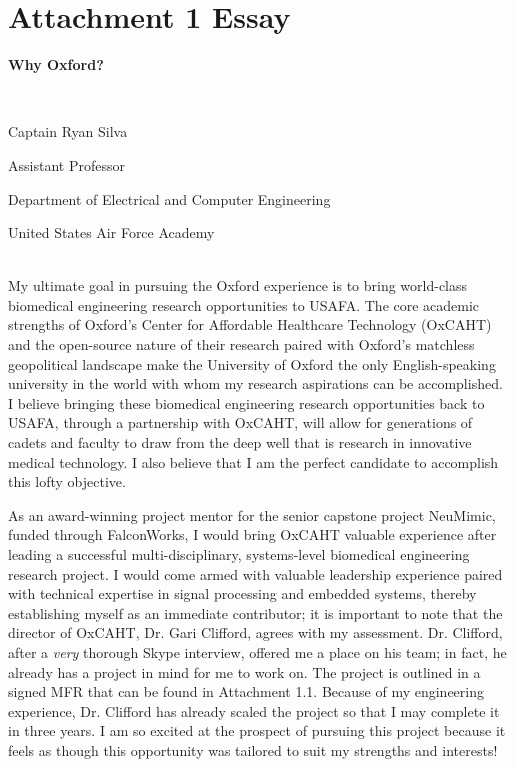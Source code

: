 \documentclass{article}
\begin{document}
\section*{Attachment 1 \newline Essay}
	\centerline{\LARGE{\textbf{Why Oxford?}}} \hspace{0pt} \\
	\centerline{\Large{Captain Ryan Silva}}
	\centerline{\large{Assistant Professor}}
	\centerline{\large{Department of Electrical and Computer Engineering}}
	\centerline{\large{United States Air Force Academy}} \hspace{0pt} \\
\indent My ultimate goal in pursuing the Oxford experience is to bring world-class
biomedical engineering research opportunities to USAFA. The core academic
strengths of Oxford's Center for Affordable Healthcare Technology (OxCAHT) and
the open-source nature of their research paired with Oxford's matchless
geopolitical landscape make the University of Oxford the only English-speaking
university in the world with whom my research aspirations can be accomplished.
I believe bringing these biomedical engineering research opportunities back
to USAFA, through a partnership with OxCAHT, will allow for generations of cadets
and faculty to draw from the deep well that is research in innovative medical technology.
I also believe that I am the perfect candidate to accomplish
this lofty objective.

As an award-winning project mentor for the senior capstone project
NeuMimic, funded through FalconWorks, I would bring OxCAHT valuable experience after leading a
successful multi-disciplinary, systems-level biomedical engineering research project. I would 
come armed with valuable leadership experience paired with technical expertise in signal 
processing and embedded systems, thereby establishing myself as an immediate contributor;
it is important to note that the director of OxCAHT, Dr. Gari Clifford, agrees
with my assessment. Dr. Clifford, after a \emph{very} thorough Skype interview,
offered me a place on his team; in fact, he already has a project in mind for me to work on. 
The project is outlined in a signed MFR that can be found in Attachment 1.1. 
Because of my engineering experience, Dr. Clifford has already scaled the project so that I may
complete it in three years. I am so excited at the prospect of pursuing this project 
because it feels as though this opportunity was tailored to suit my strengths and interests! 
 
\end{document}
